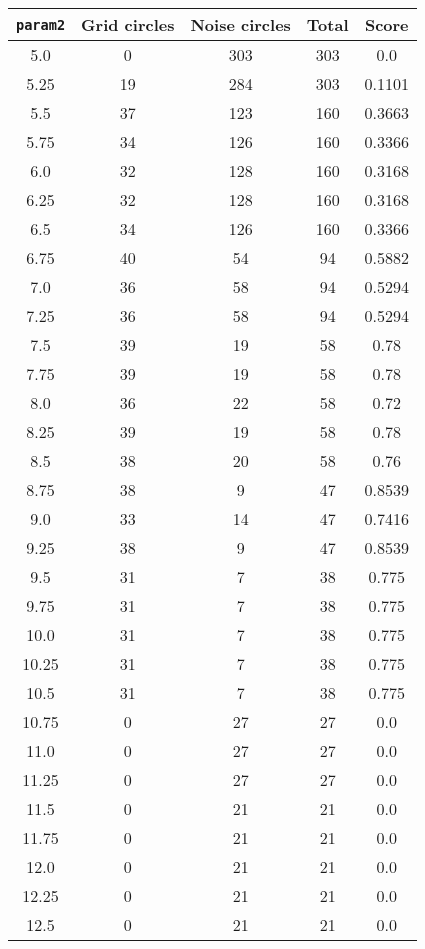 \documentclass[letterpaper, 12pt]{article}
\begin{document}
\begin{longtable}{|c|c|c|c|c|}
\hline
\textbf{\texttt{param2}} & \textbf{Grid circles} & \textbf{Noise circles} & \textbf{Total} & \textbf{Score} \\
\hline
5.0 & 0 & 303 & 303 & 0.0 \\
\hline
5.25 & 19 & 284 & 303 & 0.1101 \\
\hline
5.5 & 37 & 123 & 160 & 0.3663 \\
\hline
5.75 & 34 & 126 & 160 & 0.3366 \\
\hline
6.0 & 32 & 128 & 160 & 0.3168 \\
\hline
6.25 & 32 & 128 & 160 & 0.3168 \\
\hline
6.5 & 34 & 126 & 160 & 0.3366 \\
\hline
6.75 & 40 & 54 & 94 & 0.5882 \\
\hline
7.0 & 36 & 58 & 94 & 0.5294 \\
\hline
7.25 & 36 & 58 & 94 & 0.5294 \\
\hline
7.5 & 39 & 19 & 58 & 0.78 \\
\hline
7.75 & 39 & 19 & 58 & 0.78 \\
\hline
8.0 & 36 & 22 & 58 & 0.72 \\
\hline
8.25 & 39 & 19 & 58 & 0.78 \\
\hline
8.5 & 38 & 20 & 58 & 0.76 \\
\hline
8.75 & 38 & 9 & 47 & 0.8539 \\
\hline
9.0 & 33 & 14 & 47 & 0.7416 \\
\hline
9.25 & 38 & 9 & 47 & 0.8539 \\
\hline
9.5 & 31 & 7 & 38 & 0.775 \\
\hline
9.75 & 31 & 7 & 38 & 0.775 \\
\hline
10.0 & 31 & 7 & 38 & 0.775 \\
\hline
10.25 & 31 & 7 & 38 & 0.775 \\
\hline
10.5 & 31 & 7 & 38 & 0.775 \\
\hline
10.75 & 0 & 27 & 27 & 0.0 \\
\hline
11.0 & 0 & 27 & 27 & 0.0 \\
\hline
11.25 & 0 & 27 & 27 & 0.0 \\
\hline
11.5 & 0 & 21 & 21 & 0.0 \\
\hline
11.75 & 0 & 21 & 21 & 0.0 \\
\hline
12.0 & 0 & 21 & 21 & 0.0 \\
\hline
12.25 & 0 & 21 & 21 & 0.0 \\
\hline
12.5 & 0 & 21 & 21 & 0.0 \\

\end{longtable}
\end{document}
